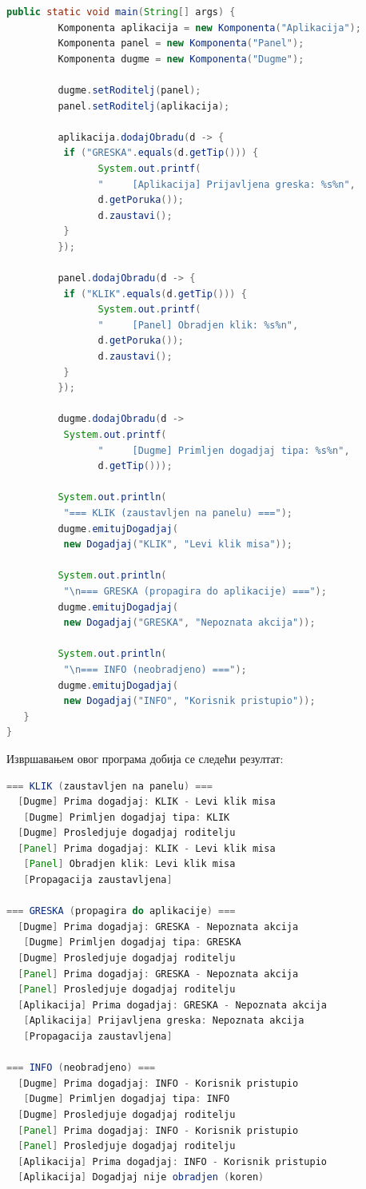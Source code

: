 \begin{lstlisting}[language=Java]
   public static void main(String[] args) {
         Komponenta aplikacija = new Komponenta("Aplikacija");
         Komponenta panel = new Komponenta("Panel");
         Komponenta dugme = new Komponenta("Dugme");
 
         dugme.setRoditelj(panel);
         panel.setRoditelj(aplikacija);
 
         aplikacija.dodajObradu(d -> {
          if ("GRESKA".equals(d.getTip())) {
                System.out.printf(
                "     [Aplikacija] Prijavljena greska: %s%n",
                d.getPoruka());
                d.zaustavi();
          }
         });
 
         panel.dodajObradu(d -> {
          if ("KLIK".equals(d.getTip())) {
                System.out.printf(
                "     [Panel] Obradjen klik: %s%n",
                d.getPoruka());
                d.zaustavi();
          }
         });
 
         dugme.dodajObradu(d ->
          System.out.printf(
                "     [Dugme] Primljen dogadjaj tipa: %s%n",
                d.getTip()));
 
         System.out.println(
          "=== KLIK (zaustavljen na panelu) ===");
         dugme.emitujDogadjaj(
          new Dogadjaj("KLIK", "Levi klik misa"));
 
         System.out.println(
          "\n=== GRESKA (propagira do aplikacije) ===");
         dugme.emitujDogadjaj(
          new Dogadjaj("GRESKA", "Nepoznata akcija"));
 
         System.out.println(
          "\n=== INFO (neobradjeno) ===");
         dugme.emitujDogadjaj(
          new Dogadjaj("INFO", "Korisnik pristupio"));
   }
}
\end{lstlisting}


Извршавањем овог програма добија се следећи резултат:


\begin{lstlisting}[language=Java]
=== KLIK (zaustavljen na panelu) ===
  [Dugme] Prima dogadjaj: KLIK - Levi klik misa
   [Dugme] Primljen dogadjaj tipa: KLIK
  [Dugme] Prosledjuje dogadjaj roditelju
  [Panel] Prima dogadjaj: KLIK - Levi klik misa
   [Panel] Obradjen klik: Levi klik misa
   [Propagacija zaustavljena]
 
=== GRESKA (propagira do aplikacije) ===
  [Dugme] Prima dogadjaj: GRESKA - Nepoznata akcija
   [Dugme] Primljen dogadjaj tipa: GRESKA
  [Dugme] Prosledjuje dogadjaj roditelju
  [Panel] Prima dogadjaj: GRESKA - Nepoznata akcija
  [Panel] Prosledjuje dogadjaj roditelju
  [Aplikacija] Prima dogadjaj: GRESKA - Nepoznata akcija
   [Aplikacija] Prijavljena greska: Nepoznata akcija
   [Propagacija zaustavljena]
 
=== INFO (neobradjeno) ===
  [Dugme] Prima dogadjaj: INFO - Korisnik pristupio
   [Dugme] Primljen dogadjaj tipa: INFO
  [Dugme] Prosledjuje dogadjaj roditelju
  [Panel] Prima dogadjaj: INFO - Korisnik pristupio
  [Panel] Prosledjuje dogadjaj roditelju
  [Aplikacija] Prima dogadjaj: INFO - Korisnik pristupio
  [Aplikacija] Dogadjaj nije obradjen (koren)
\end{lstlisting}


